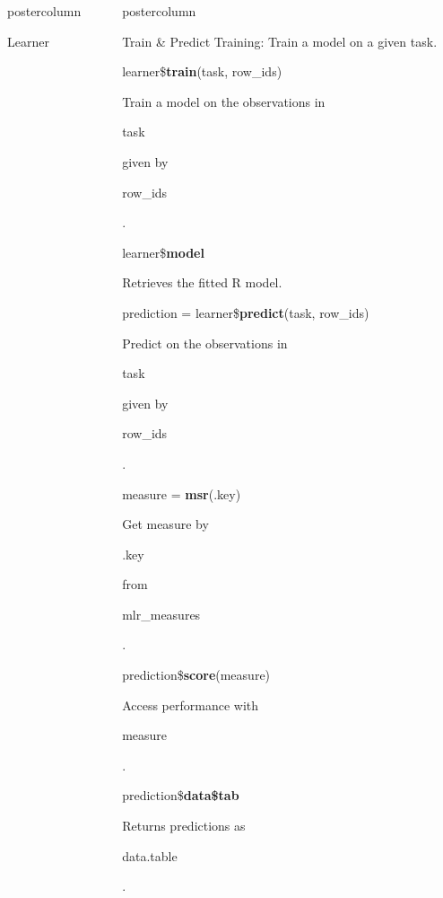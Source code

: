 \documentclass{beamer}
\newlength{\columnheight} %
\newcommand{\codeinline}[1]{\begin{codeboxinline}#1\end{codeboxinline}}
\begin{document}
\begin{frame}[fragile]{}
\begin{columns}
\begin{column}{.245\textwidth}
\begin{beamercolorbox}[center]{postercolumn}
\begin{minipage}{.98\textwidth}
{\begin{myblock}{Learner}
					\end{myblock}
					\vfill
					}
				\end{minipage}
			\end{beamercolorbox}
		\end{column}
		\begin{column}{.245\textwidth}
			\begin{beamercolorbox}[center]{postercolumn}
				\begin{minipage}{.98\textwidth}
					\parbox[t][\columnheight]{\textwidth}{
						\begin{myblock}{Train \& Predict}
						Training: Train a model on a given task.
						\vspace{1em} %
						\\
						\begin{codebox}
							learner\$\textbf{train}(task, row\_ids)
						\end{codebox}
						Train a model on the observations in \codeinline{task} given by \codeinline{row\_ids}.
						\\
						\begin{codebox}
							learner\$\textbf{model}
						\end{codebox}
						Retrieves the fitted R model.
						\\
						\vspace{1em} %
						\begin{codebox}
							prediction = learner\$\textbf{predict}(task, row\_ids)
						\end{codebox}
						Predict on the observations in \codeinline{task} given by \codeinline{row\_ids}.
						\\
						\begin{codebox}
							measure = \textbf{msr}(.key)
						\end{codebox}
						Get measure by \codeinline{.key} from \codeinline{mlr\_measures}.
						\\
						\begin{codebox}
							prediction\$\textbf{score}(measure)
						\end{codebox}
						Access performance with \codeinline{measure}.
						\\
						\begin{codebox}
							prediction\$\textbf{data\$tab}
						\end{codebox}
						Returns predictions as \codeinline{data.table}.
					\end{myblock}
					\vfill
					}
				\end{minipage}
			\end{beamercolorbox}
		\end{column}
	\end{columns}
\end{frame}
\end{document}
